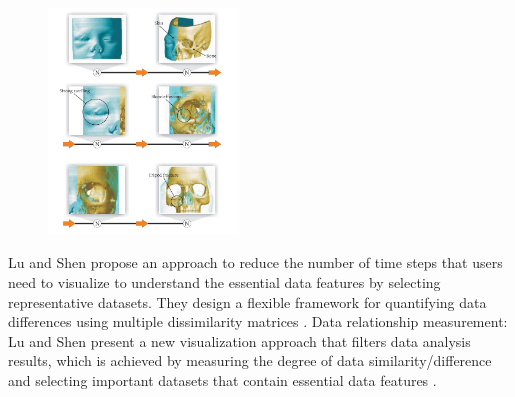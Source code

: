 \documentclass{egpubl}
\begin{document}
%
\begin{figure}
\includegraphics[width=0.45\textwidth]{./images/wohlfart07storyTelling}
\label{fig:wohlfart07storyTelling}
\end{figure}

Lu and Shen propose an approach to reduce the number of time
steps that users need to visualize to understand the essential data features by selecting representative datasets. They design a flexible framework for quantifying data differences using multiple dissimilarity matrices \cite{lu2008interactive}.
Data relationship measurement: Lu and Shen \cite{lu2008interactive}  present a new visualization approach that filters data analysis results, which is achieved by measuring the degree of data similarity/difference and selecting important datasets that contain essential data features \cite{lu2008interactive}. 
\end{document}
